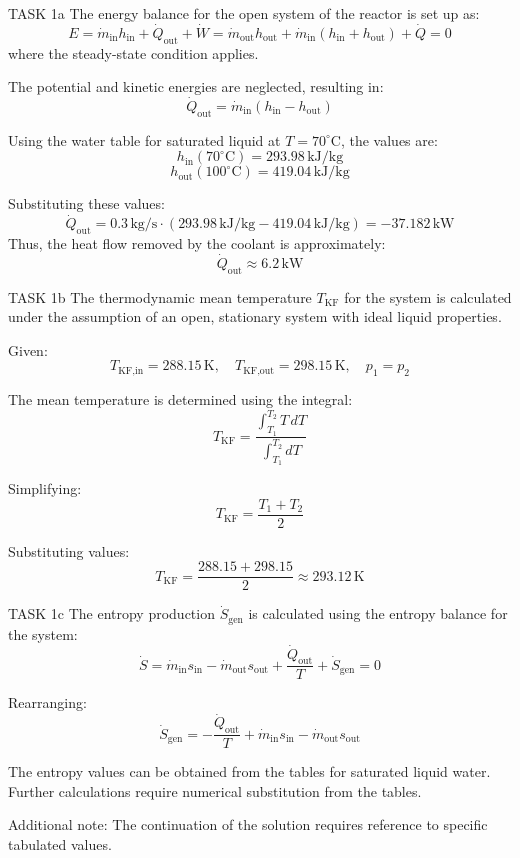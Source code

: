 TASK 1a  
The energy balance for the open system of the reactor is set up as:  
\[
E = \dot{m}_{\text{in}} h_{\text{in}} + \dot{Q}_{\text{out}} + \dot{W} = \dot{m}_{\text{out}} h_{\text{out}} + \dot{m}_{\text{in}} \left( h_{\text{in}} + h_{\text{out}} \right) + \dot{Q} = 0
\]  
where the steady-state condition applies.  

The potential and kinetic energies are neglected, resulting in:  
\[
\dot{Q}_{\text{out}} = \dot{m}_{\text{in}} \left( h_{\text{in}} - h_{\text{out}} \right)
\]  

Using the water table for saturated liquid at \( T = 70^\circ\text{C} \), the values are:  
\[
h_{\text{in}}(70^\circ\text{C}) = 293.98 \, \text{kJ/kg}
\]  
\[
h_{\text{out}}(100^\circ\text{C}) = 419.04 \, \text{kJ/kg}
\]  

Substituting these values:  
\[
\dot{Q}_{\text{out}} = 0.3 \, \text{kg/s} \cdot (293.98 \, \text{kJ/kg} - 419.04 \, \text{kJ/kg}) = -37.182 \, \text{kW}
\]  
Thus, the heat flow removed by the coolant is approximately:  
\[
\dot{Q}_{\text{out}} \approx 6.2 \, \text{kW}
\]  

TASK 1b  
The thermodynamic mean temperature \( T_{\text{KF}} \) for the system is calculated under the assumption of an open, stationary system with ideal liquid properties.  

Given:  
\[
T_{\text{KF,in}} = 288.15 \, \text{K}, \quad T_{\text{KF,out}} = 298.15 \, \text{K}, \quad p_1 = p_2
\]  

The mean temperature is determined using the integral:  
\[
T_{\text{KF}} = \frac{\int_{T_1}^{T_2} T \, dT}{\int_{T_1}^{T_2} dT}
\]  

Simplifying:  
\[
T_{\text{KF}} = \frac{T_1 + T_2}{2}
\]  

Substituting values:  
\[
T_{\text{KF}} = \frac{288.15 + 298.15}{2} \approx 293.12 \, \text{K}
\]  

TASK 1c  
The entropy production \( \dot{S}_{\text{gen}} \) is calculated using the entropy balance for the system:  
\[
\dot{S} = \dot{m}_{\text{in}} s_{\text{in}} - \dot{m}_{\text{out}} s_{\text{out}} + \frac{\dot{Q}_{\text{out}}}{T} + \dot{S}_{\text{gen}} = 0
\]  

Rearranging:  
\[
\dot{S}_{\text{gen}} = -\frac{\dot{Q}_{\text{out}}}{T} + \dot{m}_{\text{in}} s_{\text{in}} - \dot{m}_{\text{out}} s_{\text{out}}
\]  

The entropy values can be obtained from the tables for saturated liquid water. Further calculations require numerical substitution from the tables.  

Additional note: The continuation of the solution requires reference to specific tabulated values.